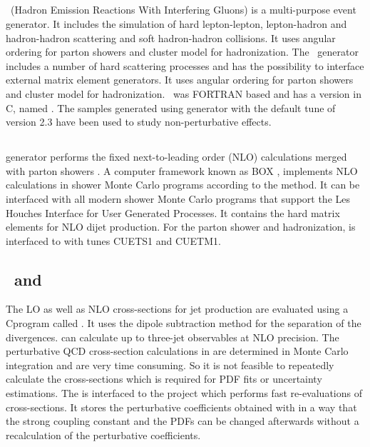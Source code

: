 \subsection{\HERWIG}
\HERWIG~(Hadron Emission Reactions With Interfering Gluons) \cite{Corcella:2000bw} is a multi-purpose event generator. It includes the simulation of hard lepton-lepton, lepton-hadron and hadron-hadron scattering and soft hadron-hadron collisions. It uses angular ordering for parton showers and cluster model for hadronization. The \HERWIG~generator includes a number of hard scattering processes and has the possibility to interface external matrix element generators. It uses angular ordering for parton showers and cluster model for hadronization. \HERWIG~was FORTRAN based and has a version in C\plusn\plusn, named \HERWIGPP \cite{Bahr:2008pv}. The samples generated using \HERWIGPP generator with the default tune of version 2.3 \cite{Bahr:2008tf} have been used to study non-perturbative effects. 

\subsection{\POWHEG}
\POWHEG generator performs the fixed next-to-leading order (NLO) calculations merged with parton showers \cite{Frixione:2007vw, Nason:2004rx, Alioli:2010xa}. A computer framework known as \POWHEG BOX \cite{Oleari:2010nx}, implements NLO calculations in shower Monte Carlo programs according to the \POWHEG method. It can be interfaced with all modern shower Monte Carlo programs that support the Les Houches Interface for User Generated Processes. It contains the hard matrix elements for NLO dijet production. For the parton shower and hadronization, \POWHEG is interfaced to \PYTHIAE with tunes CUETS1 and CUETM1.

\subsection{\NLOJET~and \fastNLO}
The LO as well as NLO cross-sections for jet production are evaluated using a C\plusn\plus program called \NLOJETPP \cite{Nagy:2001fj,Nagy:2003tz}. It uses the dipole subtraction method for the separation of the divergences. \NLOJETPP can calculate up to three-jet observables at NLO precision. The perturbative QCD cross-section calculations in \NLOJETPP are determined in Monte Carlo integration and are very time consuming. So it is not feasible to repeatedly calculate the cross-sections which is required for PDF fits or uncertainty estimations. The \NLOJETPP is interfaced to the \fastNLO project \cite{Kluge:2006xs,Britzger:2012bs} which performs fast re-evaluations of cross-sections. It stores the perturbative coefficients obtained with \NLOJETPP in a way that the strong coupling constant and the PDFs can be changed afterwards without a recalculation of the perturbative coefficients.

